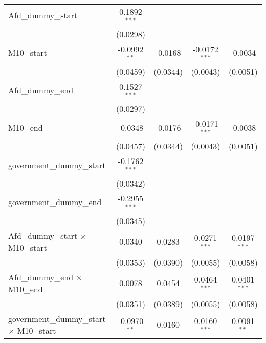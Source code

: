 \documentclass[10pt,a4paper]{article}
\begin{document}
\begin{tabular}{lcccc}
   Afd\_dummy\_start                                & 0.1892$^{***}$  &                &                 &   \\   
                                                    & (0.0298)        &                &                 &   \\   
   M10\_start                                       & -0.0992$^{**}$  & -0.0168        & -0.0172$^{***}$ & -0.0034\\   
                                                    & (0.0459)        & (0.0344)       & (0.0043)        & (0.0051)\\   
   Afd\_dummy\_end                                  & 0.1527$^{***}$  &                &                 &   \\   
                                                    & (0.0297)        &                &                 &   \\   
   M10\_end                                         & -0.0348         & -0.0176        & -0.0171$^{***}$ & -0.0038\\   
                                                    & (0.0457)        & (0.0344)       & (0.0043)        & (0.0051)\\   
   government\_dummy\_start                         & -0.1762$^{***}$ &                &                 &   \\   
                                                    & (0.0342)        &                &                 &   \\   
   government\_dummy\_end                           & -0.2955$^{***}$ &                &                 &   \\   
                                                    & (0.0345)        &                &                 &   \\   
   Afd\_dummy\_start $\times$ M10\_start            & 0.0340          & 0.0283         & 0.0271$^{***}$  & 0.0197$^{***}$\\   
                                                    & (0.0353)        & (0.0390)       & (0.0055)        & (0.0058)\\   
   Afd\_dummy\_end $\times$ M10\_end                & 0.0078          & 0.0454         & 0.0464$^{***}$  & 0.0401$^{***}$\\   
                                                    & (0.0351)        & (0.0389)       & (0.0055)        & (0.0058)\\   
   government\_dummy\_start $\times$ M10\_start     & -0.0970$^{**}$  & 0.0160         & 0.0160$^{***}$  & 0.0091$^{**}$\\   

\end{tabular}
\end{document}
